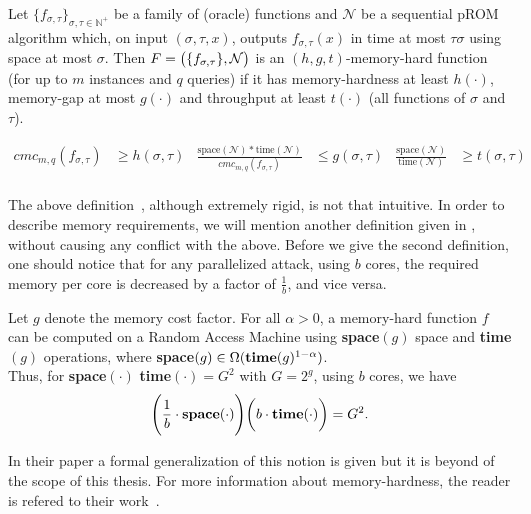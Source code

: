 \begin{definition} \label{Memhard1}
  Let $\{ f_{\sigma, \tau} \}_{\sigma, \tau \in \mathbb{N}^{+}}$ be a family of (oracle) functions and $\mathcal{N}$ be a sequential pROM algorithm which, on input $(\sigma, \tau, x)$, outputs $f_{\sigma, \tau}(x)$ in time at most $\tau \sigma$ using space at most $\sigma$. Then $F=\big{(} \{ f_{\sigma,\tau} \}, \mathcal{N} \big{)}$
  is an $(h,g,t)$-memory-hard function (for up to $m$ instances and $q$ queries) if it has memory-hardness at least $h(\cdot)$, memory-gap at most $g(\cdot)$ and throughput at least $t(\cdot)$ (all functions of $\sigma$ and $\tau$).

\begin{align*}
cmc_{m,q}(f_{\sigma, \tau})&\geq h(\sigma, \tau)           &  \frac{\mbox{space}(\mathcal{N})*\mbox{time}(\mathcal{N})}{cmc_{m,q}(f_{\sigma, \tau})} &\leq g(\sigma, \tau)             &  \frac{\mbox{space}(\mathcal{N})}{\mbox{time}(\mathcal{N})} &\geq t(\sigma, \tau)\\
\end{align*}
%
\end{definition}

The above definition~\cite{cryptoeprint:2016:875}, although extremely rigid, is not that intuitive. In order to describe memory requirements, we will mention another definition given in \cite{ForlerLW13}, without causing any conflict with the above. Before we give the second definition, one should notice that for any parallelized attack, using $b$ cores, the required memory per core is decreased by a factor of $\frac{1}{b}$, and vice versa.

\begin{definition}
  Let $g$ denote the memory cost factor. For all $\alpha > 0$, a memory-hard function $f$ can be computed on a Random Access Machine using \textbf{space}$(g)$ space and \textbf{time}$(g)$ operations, where \textbf{space}$(g) \in \Omega(\mbox{\textbf{time}}(g)^{1-\alpha})$.\\

  \noindent Thus, for \textbf{space}$(\cdot)$ \textbf{time}$(\cdot)$\:$=G^2$ with $G=2^g$, using $b$ cores, we have
  \begin{equation} \label{eqn:memhard}
    \Bigg{(} \frac{1}{b} \cdot \mbox{\textbf{space}}(\cdot) \Bigg{)} \bigg{(} b \cdot \mbox{\textbf{time}}(\cdot) \bigg{)} = G^2.
  \end{equation}
\end{definition}
In their paper a formal generalization of this notion is given but it is beyond of the scope of this thesis. For more information about memory-hardness, the reader is refered to their work~\cite{ForlerLW13}.
%
